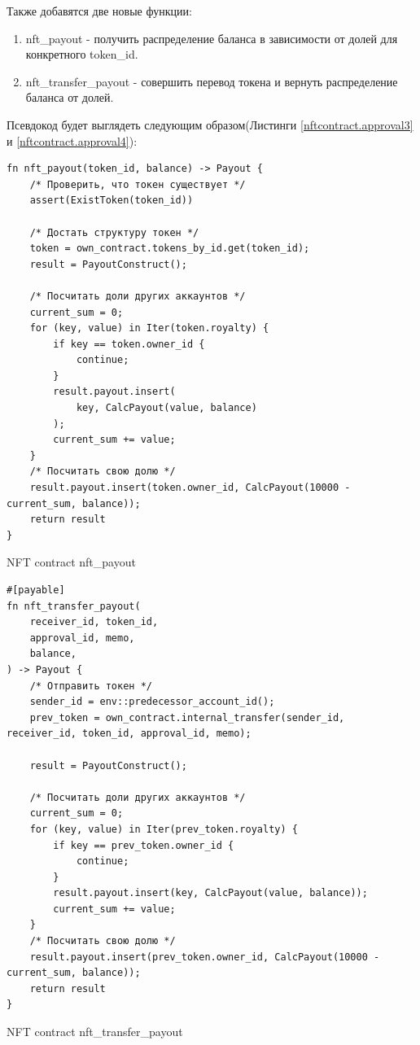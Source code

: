 Также добавятся две новые функции:
\begin{enumerate}
\item nft\_payout - получить распределение баланса в зависимости от долей для конкретного token\_id.
\item nft\_transfer\_payout - совершить перевод токена и вернуть распределение баланса от долей.
\end{enumerate}
Псевдокод будет выглядеть следующим образом(Листинги  {\color{blue}\ref{nftcontract.approval3}} и {\color{blue}\ref{nftcontract.approval4}}):
\begin{listing}
\begin{verbatim}
fn nft_payout(token_id, balance) -> Payout {
    /* Проверить, что токен существует */
    assert(ExistToken(token_id))

    /* Достать структуру токен */
    token = own_contract.tokens_by_id.get(token_id);
    result = PayoutConstruct();

    /* Посчитать доли других аккаунтов */
    current_sum = 0;
    for (key, value) in Iter(token.royalty) {
        if key == token.owner_id {
            continue;
        }
        result.payout.insert(
            key, CalcPayout(value, balance)
        );
        current_sum += value;
    }
    /* Посчитать свою долю */
    result.payout.insert(token.owner_id, CalcPayout(10000 - current_sum, balance));
    return result
}
\end{verbatim}
\caption{NFT contract nft\_payout}
\label{nftcontract.approval3}
\end{listing}

\begin{listing}
\begin{verbatim}
#[payable]
fn nft_transfer_payout(
    receiver_id, token_id,
    approval_id, memo,
    balance,
) -> Payout {
    /* Отправить токен */
    sender_id = env::predecessor_account_id();
    prev_token = own_contract.internal_transfer(sender_id, receiver_id, token_id, approval_id, memo);

    result = PayoutConstruct();

    /* Посчитать доли других аккаунтов */
    current_sum = 0;
    for (key, value) in Iter(prev_token.royalty) {
        if key == prev_token.owner_id {
            continue;
        }
        result.payout.insert(key, CalcPayout(value, balance));
        current_sum += value;
    }
    /* Посчитать свою долю */
    result.payout.insert(prev_token.owner_id, CalcPayout(10000 - current_sum, balance));
    return result
}
\end{verbatim}
\caption{NFT contract nft\_transfer\_payout}
\label{nftcontract.approval4}
\end{listing}

